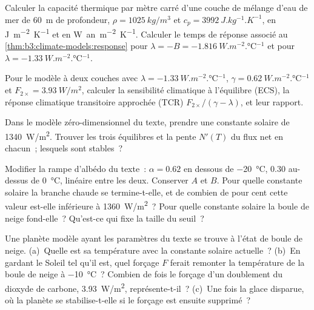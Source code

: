 \begin{exercise}[$\star$]\label{exo:b3:climate-models:3}
Calculer la capacité thermique par mètre carré d'une couche de mélange d'eau de mer
de \qty{60}{m} de profondeur, $\rho = \qty{1025}{kg/m^3}$ et $c_p = \qty{3992}{J.kg^{-1}.K^{-1}}$,
en \unit{J.m^{-2}.K^{-1}} et en \unit{W.an.m^{-2}.K^{-1}}. Calculer le temps de réponse
associé au \cref{thm:b3:climate-models:response} pour $\lambda = -B =
\qty{-1.816}{W.m^{-2}.\celsius^{-1}}$ et pour $\lambda =
\qty{-1.33}{W.m^{-2}.\celsius^{-1}}$.
\end{exercise}

\begin{exercise}[$\star$]\label{exo:b3:climate-models:4}
Pour le modèle à deux couches avec $\lambda = \qty{-1.33}{W.m^{-2}.\celsius^{-1}}$,
$\gamma = \qty{0.62}{W.m^{-2}.\celsius^{-1}}$ et $F_{2\times} =
\qty{3.93}{W/m^2}$, calculer la sensibilité climatique à l'équilibre (ECS), la réponse climatique transitoire approchée (TCR) $F_{2\times}/
(\gamma - \lambda)$, et leur rapport.
\end{exercise}

\begin{exercise}[$\star\star$]\label{exo:b3:climate-models:5}
Dans le modèle zéro-dimensionnel du texte, prendre une constante solaire de
\qty{1340}{W/m^2}. Trouver les trois équilibres et la pente $N'(T)$ du
flux net en chacun~; lesquels sont stables~?
\end{exercise}

\begin{exercise}[$\star\star$]\label{exo:b3:climate-models:6}
Modifier la rampe d'albédo du texte~: $\alpha = 0.62$ en dessous de \qty{-20}{\celsius},
$0.30$ au-dessus de \qty{0}{\celsius}, linéaire entre les deux. Conserver $A$ et $B$. Pour quelle constante solaire
la branche chaude se termine-t-elle, et de combien de pour cent cette valeur est-elle
inférieure à \qty{1360}{W/m^2}~? Pour quelle constante solaire la boule de neige fond-elle~?
Qu'est-ce qui fixe la taille du seuil~?
\end{exercise}

\begin{exercise}[$\star\star$]\label{exo:b3:climate-models:7}
Une planète modèle ayant les paramètres du texte se trouve à l'état de boule de neige.
(a)~Quelle est sa température avec la constante solaire actuelle~? (b)~En gardant le Soleil tel qu'il est, quel forçage $F$
ferait remonter la température de la boule de neige à
\qty{-10}{\celsius}~? Combien de fois le forçage d'un doublement du dioxyde de carbone,
\qty{3.93}{W/m^2}, représente-t-il~? (c)~Une fois la glace disparue, où la planète
se stabilise-t-elle si le forçage est ensuite supprimé~?
\end{exercise}


